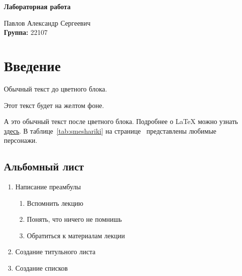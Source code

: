

\begin{titlepage}
    \begin{center}
        \textbf{\LARGE{} Лабораторная работа}\\
    \end{center}
    \vfill
    \begin{flushright}
        \large Павлов Александр Сергеевич\\
        \textbf{Группа:} 22107\\
    \end{flushright}
\end{titlepage}

\newpage
\tableofcontents

\newpage
\chapter{Введение}
Обычный текст до цветного блока.

\colorbox{yellow!20}{%
    \begin{minipage}{\textwidth}
        Этот текст будет на желтом фоне. 
        \blindtext[1]
    \end{minipage}%
}

А это обычный текст после цветного блока.
Подробнее о LaTeX можно узнать 
\href{https://www.overleaf.com/learn}{здесь}.
В таблице~\ref{tab:smeshariki} на странице~\pageref{tab:smeshariki}
представлены любимые персонажи. 

\newpage
\pagecolor{yellow!20}
\begin{landscape}
    \chapter{Альбомный лист}
    \begin{enumerate}
        \item Написание преамбулы
        \begin{enumerate}
            \item Вспомнить лекцию
            \item Понять, что ничего не помнишь
            \item Обратиться к материалам лекции
        \end{enumerate}
        \item Создание титульного листа
        \item Создание списков
    \end{enumerate}
\end{landscape}


